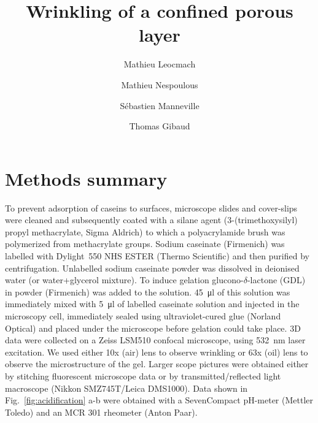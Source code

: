 \documentclass[twocolumn,superscriptaddress,showpacs,preprintnumbers,amsmath,amssymb,prl]{revtex4-1}
\begin{document}
\title{Wrinkling of a confined porous layer}
\author{Mathieu Leocmach}
\author{Mathieu Nespoulous}
\author{Sébastien Manneville}
\author{Thomas Gibaud}

\begin{abstract}

\end{abstract}

\maketitle

\section*{Methods summary}
To prevent adsorption of caseins to surfaces, microscope slides and cover-slips were cleaned and subsequently coated with a silane agent (3-(trimethoxysilyl) propyl methacrylate, Sigma Aldrich) to which a polyacrylamide brush was polymerized from methacrylate groups.
Sodium caseinate (Firmenich) was labelled with Dylight~550 NHS ESTER (Thermo Scientific) and then purified by centrifugation. Unlabelled sodium caseinate powder was dissolved in deionised water (or water+glycerol mixture). To induce gelation glucono-$\delta$-lactone (GDL) in powder (Firmenich) was added to the solution. \SI{45}{\micro\litre} of this solution was immediately mixed with \SI{5}{\micro\litre} of labelled caseinate solution and injected in the microscopy cell, immediately sealed using ultraviolet-cured glue (Norland Optical) and placed under the microscope before gelation could take place. 
3D data were collected on a Zeiss LSM510 confocal microscope, using \SI{532}{\nano\meter} laser excitation. We used either 10x (air) lens to observe wrinkling or 63x (oil) lens to observe the microstructure of the gel. Larger scope pictures were obtained either by stitching fluorescent microscope data or by transmitted/reflected light macroscope (Nikkon SMZ745T/Leica DMS1000).
Data shown in Fig.~\ref{fig:acidification} a-b were obtained with a SevenCompact pH-meter (Mettler Toledo) and an MCR 301 rheometer (Anton Paar).
\end{document}
